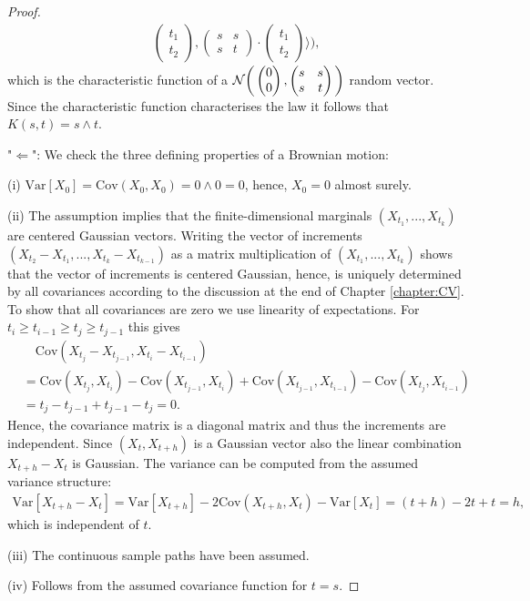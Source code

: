 \begin{proof}[Proof]
\begin{align*}
\begin{pmatrix}
						t_1 \\
						t_2
					\end{pmatrix},\begin{pmatrix}
					s & s \\
					s & t
				\end{pmatrix}\cdot \begin{pmatrix}
				t_1 \\
				t_2
			\end{pmatrix} \bigg\rangle \bigg),
		\end{align*} 
		which is the characteristic function of a $\mathcal{N} \bigg( \begin{pmatrix}
			0\\
			0
		\end{pmatrix}, \begin{pmatrix}
		s & s \\
		s & t
	\end{pmatrix}\bigg)$ random vector. Since the characteristic function characterises the law it follows that $K(s,t)=s\wedge t$.\smallskip

	"$\Leftarrow$"{}: We check the three defining properties of a Brownian motion:

	(i) $\text{Var}[X_0]=\text{Cov}(X_0,X_0)=0\wedge 0=0$, hence, $X_0=0$ almost surely.\smallskip
	
	(ii) The assumption implies that the finite-dimensional marginals $(X_{t_1},...,X_{t_k})$ are centered Gaussian vectors. Writing the vector of increments $(X_{t_2}-X_{t_{1}},...,X_{t_k}-X_{t_{k-1}})$ as a matrix multiplication of $(X_{t_1},...,X_{t_k})$ shows that the vector of increments is centered Gaussian, hence, is uniquely determined by all  covariances according to the discussion at the end of Chapter \ref{chapter:CV}. To show that all covariances are zero we use linearity of expectations. For $t_i\geq t_{i-1}\geq t_j\geq t_{j-1}$ this gives
	\begin{align*}
		&\quad \text{Cov}(X_{t_j}-X_{t_{j-1}}, X_{t_i}-X_{t_{i-1}})\\
		&=\text{Cov}(X_{t_j},X_{t_{i}}) -\text{Cov}(X_{t_{j-1}},X_{t_{i}})+\text{Cov}(X_{t_{j-1}},X_{t_{i-1}})-\text{Cov}(X_{t_{j}},X_{t_{i-1}})\\
		&=t_j-t_{j-1}+t_{j-1}-t_j=0.
	\end{align*}
	Hence, the covariance matrix is a diagonal matrix and thus the increments are independent. Since $(X_t,X_{t+h})$ is a Gaussian vector also the linear combination $X_{t+h}-X_{t}$ is Gaussian. The variance can be computed from the assumed variance structure:
	\begin{align*}
		\text{Var}[X_{t+h}-X_t]=\text{Var}[X_{t+h}]-2\text{Cov}(X_{t+h},X_t)-\text{Var}[X_t]=(t+h)-2t+t=h,
	\end{align*}
	which is independent of $t$.\smallskip

	(iii) The continuous sample paths have been assumed.\smallskip

	(iv) Follows from the assumed covariance function for $t=s$.
\end{proof}
